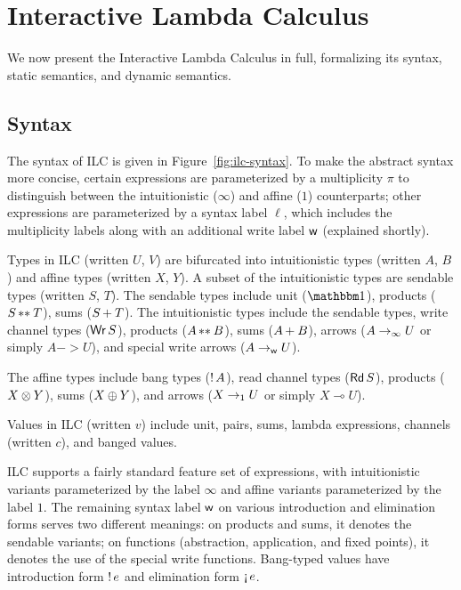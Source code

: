 
%



\section{Interactive Lambda Calculus}
\label{sec:ilc}

We now present the Interactive Lambda Calculus in full, formalizing its syntax,
static semantics, and dynamic semantics.

\subsection{Syntax}
\label{subsec:syntax}

The syntax of ILC is given in Figure~\ref{fig:ilc-syntax}. To make the abstract
syntax more concise, certain expressions are parameterized by a multiplicity $\pi$
to distinguish between the intuitionistic ($\infty$) and affine ($1$) counterparts;
other expressions are parameterized by a syntax label $\ell$, which includes the
multiplicity labels along with an additional write label $\textsf{w}$ (explained
shortly).

Types in ILC (written $U$, $V$) are bifurcated into intuitionistic types
(written $A$, $B$) and affine types (written $X$, $Y$). A subset of the
intuitionistic types are sendable types (written $S$, $T$). The sendable types
include unit ($\tyUnit$), products (${S}\, {**}_{}\, {T}$), sums
(${S}\, {+}_{}\, {T}$). The intuitionistic types include the sendable types, write
channel types ($\textnormal{\textsf{Wr}}\,S$), products (${A}\, {**}_{}\, {B}$), sums
(${A}\, {+}_{}\, {B}$), arrows (${A}\rightarrow_{\infty}{U}$ or simply $A -> U$), and special
write arrows (${A}\rightarrow_{\textsf{w}}{U}$). 

The affine types include bang types (${!}\,{A}$), read channel types
($\textnormal{\textsf{Rd}}\,S$), products (${X}\otimes{Y}$), sums (${X}\oplus{Y}$), and arrows
(${X}\rightarrow_{1}{U}$ or simply $X \multimap U$).

Values in ILC (written $v$) include unit, pairs, sums, lambda expressions,
channels (written $c$), and banged values.

ILC supports a fairly standard feature set of expressions, with intuitionistic
variants parameterized by the label $\infty$ and affine variants parameterized by the
label $1$. The remaining syntax label $\textsf{w}$ on various introduction and
elimination forms serves two different meanings: on products and sums, it
denotes the sendable variants; on functions (abstraction, application, and fixed
points), it denotes the use of the special write functions. Bang-typed values
have introduction form ${!}\,{e}$ and elimination form $\textnormal{!`}\,{e}$.

